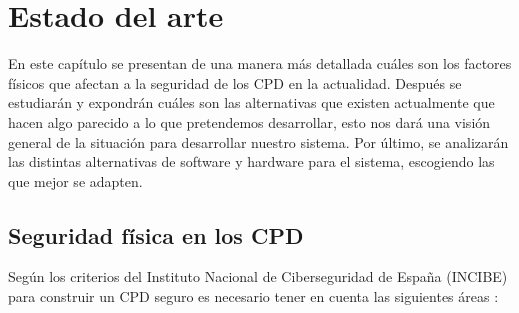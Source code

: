 \chapter{Estado del arte}
\label{ch:estado}
En este capítulo se presentan de una manera más detallada cuáles son los factores físicos que afectan a la seguridad de los CPD en la actualidad. Después se estudiarán y expondrán cuáles son las alternativas que existen actualmente que hacen algo parecido a lo que pretendemos desarrollar, esto nos dará una visión general de la situación para desarrollar nuestro sistema. Por último, se analizarán las distintas alternativas de software y hardware para el sistema, escogiendo las que mejor se adapten.

\section{Seguridad física en los CPD}
\noindent Según los criterios del Instituto Nacional de Ciberseguridad de España (INCIBE) para construir un CPD seguro es necesario tener en cuenta las siguientes áreas \cite{noauthor_pon_2015}:
